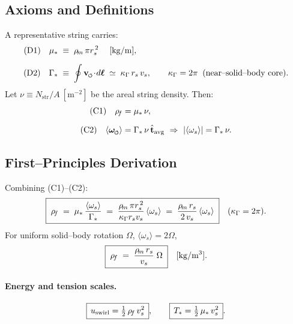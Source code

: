 \documentclass[11pt]{article}
\begin{document}
    \subsection{Axioms and Definitions}
    A representative string carries:
    \begin{align}
        \text{(D1)}\quad
        \mu_\ast &\;\equiv\; \rhom\,\pi \rs^{\,2}
        \quad\;[\mathrm{kg/m}], \\[2mm]
        \text{(D2)}\quad
        \Gamma_\ast &\;\equiv\; \oint \vswirl\!\cdot\! d\boldsymbol{\ell}
        \;\simeq\; \kappa_\Gamma\, \rs\, \vscore,
        \qquad \kappa_\Gamma=2\pi \;\; \text{(near–solid–body core)}.
    \end{align}
    Let
    \(
    \nu \equiv N_{\text{str}}/A \ [\mathrm{m^{-2}}]
    \)
    be the areal string density. Then:
    \begin{align}
        \text{(C1)}\quad
        \rhof &= \mu_\ast\,\nu, \\[2mm]
        \text{(C2)}\quad
        \langle \omegas\rangle &= \Gamma_\ast\,\nu\,\hat{\mathbf{t}}_{\text{avg}}
        \ \Rightarrow\  |\langle\omega_s\rangle|=\Gamma_\ast\,\nu.
    \end{align}

    \subsection{First–Principles Derivation}
    Combining (C1)–(C2):
    \begin{equation}
        \boxed{\;
        \rho_{\!f}
        \;=\; \mu_\ast\,\frac{\langle\omega_s\rangle}{\Gamma_\ast}
        \;=\; \frac{\rho_{\!m}\,\pi r_s^{\,2}}{\kappa_\Gamma r_s v_s}\,\langle\omega_s\rangle
        \;=\; \frac{\rho_{\!m}\,r_s}{2\,v_s}\,\langle\omega_s\rangle
        \;}
        \quad (\kappa_\Gamma=2\pi).
        \label{eq:rhof_from_omega}
    \end{equation}
    For uniform solid–body rotation \(\Omega\), \(\langle\omega_s\rangle=2\Omega\),
    \begin{equation}
        \boxed{\;
        \rho_{\!f}
        \;=\; \frac{\rho_{\!m}\,r_s}{v_s}\;\Omega
        \;}
        \quad [\mathrm{kg/m^3}].
        \label{eq:rhof_from_Omega}
    \end{equation}

    \paragraph{Energy and tension scales.}
    \[
        \boxed{\, u_{\text{swirl}}=\tfrac12\,\rho_{\!f}\,v_s^2 \,},\qquad
        \boxed{\, T_\ast = \tfrac12\,\mu_\ast\,v_s^2 \,}.
    \]
\end{document}
